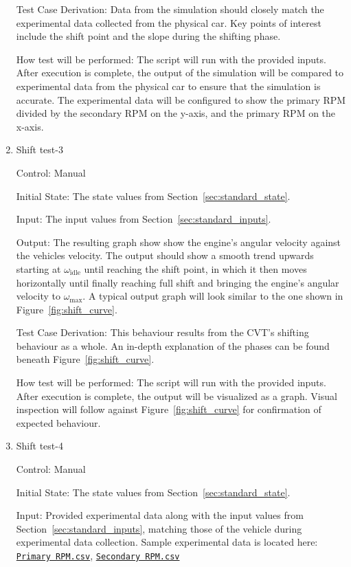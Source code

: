 \documentclass[12pt, titlepage]{article}
\newcommand{\refdata}[2]{
  \href{https://github.com/gr812b/CVT-Simulator/blob/main/experimental-data/#1
  }{\texttt{#2}}}
\begin{document}
\begin{enumerate}
  Test Case Derivation: Data from the simulation should closely match the experimental data collected from the physical car. Key points of interest include the shift point and the slope during the shifting phase.

  How test will be performed: The script will run with the provided inputs. After execution is complete, the output of the simulation will be compared to experimental data from the physical car to ensure that the simulation is accurate. The experimental data will be configured to show the primary RPM divided by the secondary RPM on the y-axis, and the primary RPM on the x-axis.
  
  \item{Shift test-3\\}
  
  Control: Manual
            
  Initial State: The state values from Section~\ref{sec:standard_state}.
  
  Input: The input values from Section~\ref{sec:standard_inputs}.
            
  Output: The resulting graph show show the engine's angular velocity against the vehicles velocity. The output should show a smooth trend upwards starting at $\omega_\text{idle}$ until reaching the shift point, in which it then moves horizontally until finally reaching full shift and bringing the engine's angular velocity to $\omega_\text{max}$. A typical output graph will look similar to the one shown in Figure~\ref{fig:shift_curve}.
  
  Test Case Derivation: This behaviour results from the CVT's shifting behaviour as a whole. An in-depth explanation of the phases can be found beneath Figure~\ref{fig:shift_curve}.
  
  How test will be performed: The script will run with the provided inputs. After execution is complete, the output will be visualized as a graph. Visual inspection will follow against Figure~\ref{fig:shift_curve} for confirmation of expected behaviour.
  
  \item{Shift test-4\\}

  Control: Manual

  Initial State: The state values from Section~\ref{sec:standard_state}.

  Input: Provided experimental data along with the input values from Section~\ref{sec:standard_inputs}, matching those of the vehicle during experimental data collection. Sample experimental data is located here: \refdata{RPM\%20PRIM.csv}{Primary RPM.csv}, \refdata{RPM\%20SEC.csv}{Secondary RPM.csv}


\end{enumerate}
\end{document}
